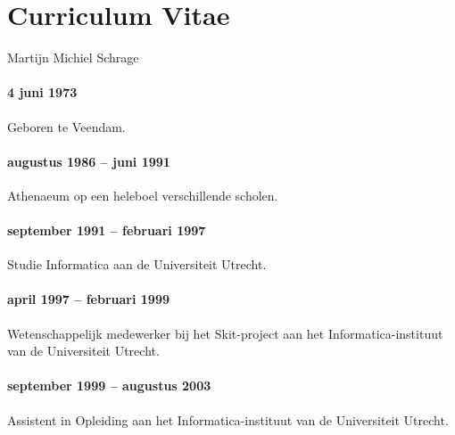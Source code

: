 \chapter*{Curriculum Vitae}
\label{chap:cv}

Martijn Michiel Schrage

\subsubsection*{4 juni 1973}
Geboren te Veendam.

\subsubsection*{augustus 1986 -- juni 1991}
Athenaeum op een heleboel verschillende scholen.

\subsubsection*{september 1991 -- februari 1997}
Studie Informatica aan de Universiteit Utrecht.

\subsubsection*{april 1997 -- februari 1999}
Wetenschappelijk medewerker bij het Skit-project aan het Informatica-instituut van de
Universiteit Utrecht.

\subsubsection*{september 1999 -- augustus 2003}
Assistent in Opleiding aan het Informatica-instituut van de
Universiteit Utrecht.
